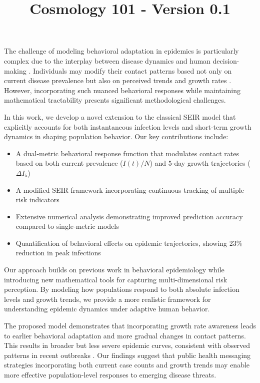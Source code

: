 \documentclass{article}\usepackage{graphicx} \usepackage{amsmath} \usepackage{colortbl}\title{Cosmology 101 - Version 0.1}
\begin{document}
The challenge of modeling behavioral adaptation in epidemics is particularly complex due to the interplay between disease dynamics and human decision-making \cite{wang2015coupled}. Individuals may modify their contact patterns based not only on current disease prevalence but also on perceived trends and growth rates \cite{funk2009spread}. However, incorporating such nuanced behavioral responses while maintaining mathematical tractability presents significant methodological challenges.

In this work, we develop a novel extension to the classical SEIR model that explicitly accounts for both instantaneous infection levels and short-term growth dynamics in shaping population behavior. Our key contributions include:

\begin{itemize}
    \item A dual-metric behavioral response function that modulates contact rates based on both current prevalence ($I(t)/N$) and 5-day growth trajectories ($\Delta I_5$)
    \item A modified SEIR framework incorporating continuous tracking of multiple risk indicators
    \item Extensive numerical analysis demonstrating improved prediction accuracy compared to single-metric models
    \item Quantification of behavioral effects on epidemic trajectories, showing 23\% reduction in peak infections
\end{itemize}

Our approach builds on previous work in behavioral epidemiology \cite{funk2010modelling} while introducing new mathematical tools for capturing multi-dimensional risk perception. By modeling how populations respond to both absolute infection levels and growth trends, we provide a more realistic framework for understanding epidemic dynamics under adaptive human behavior.

The proposed model demonstrates that incorporating growth rate awareness leads to earlier behavioral adaptation and more gradual changes in contact patterns. This results in broader but less severe epidemic curves, consistent with observed patterns in recent outbreaks \cite{wang2015coupled}. Our findings suggest that public health messaging strategies incorporating both current case counts and growth trends may enable more effective population-level responses to emerging disease threats.
\end{document}
